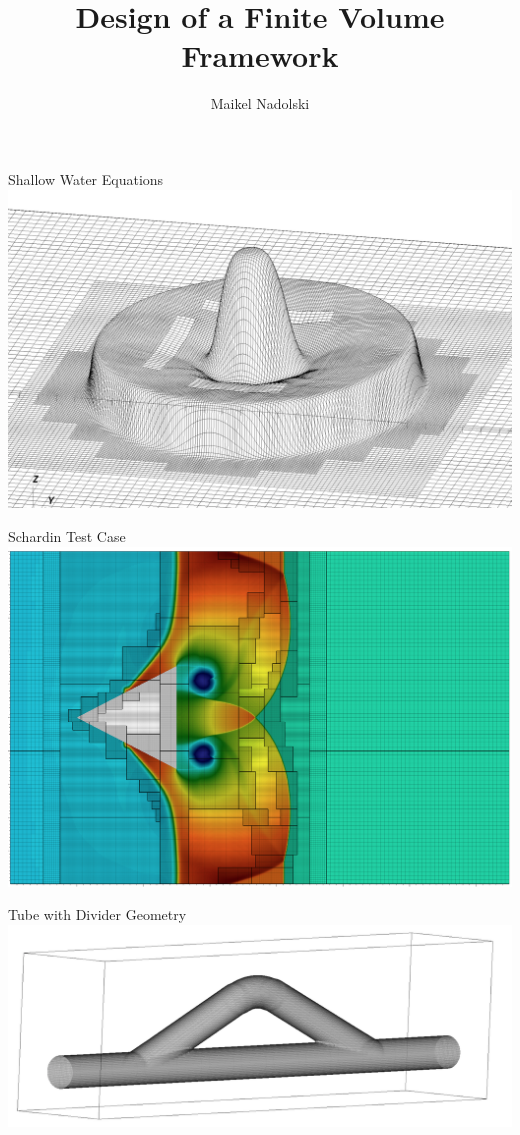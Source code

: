 \documentclass[ucs,9pt]{beamer}
\title[Finite Volume Solver]{Design of a Finite Volume Framework}
\author{Maikel Nadolski}
\institute[FU Berlin] %
{Freie Universität Berlin}
\begin{document}
\begin{frame}[plain]
  \titlepage
\end{frame}

\begin{frame}{Shallow Water Equations}
\includegraphics[width=\textwidth]{ShallowWater}
\end{frame}

\begin{frame}{Schardin Test Case}
\includegraphics[width=\textwidth]{Schardin}
\end{frame}

\begin{frame}{Tube with Divider Geometry}
\includegraphics[width=\textwidth]{Divider} 
\end{frame}
\end{document}
